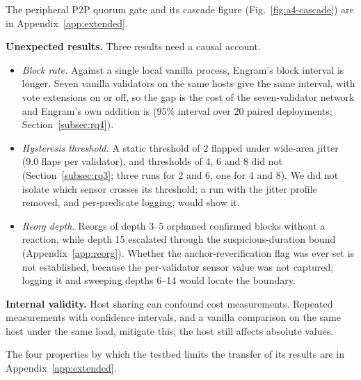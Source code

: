 The peripheral P2P quorum gate and its cascade figure (Fig.~\ref{fig:a4-cascade}) are in Appendix~\ref{app:extended}.

\textbf{Unexpected results.} Three results need a causal account.
\begin{itemize}
  \item \emph{Block rate.} Against a single local vanilla process, Engram's
  block interval is longer. Seven vanilla validators on the same hosts give the same interval,
  with vote extensions on or off, so the gap is the cost of the
  seven-validator network and Engram's own addition is \resOverheadPct{} (95\% interval
  \resOverheadCI{} over 20 paired deployments; Section~\ref{subsec:rq4}).
  \item \emph{Hysteresis threshold.} A static threshold of 2 flapped under
  wide-area jitter (9.0 flaps per validator), and thresholds of 4, 6 and 8 did
  not (Section~\ref{subsec:rq3}; three runs for 2 and 6, one for 4 and 8). We
  did not isolate which sensor crosses its threshold; a run with the jitter
  profile removed, and per-predicate logging, would show it.
  \item \emph{Reorg depth.} Reorgs of depth 3--5 orphaned confirmed blocks
  without a reaction, while depth 15 escalated through the
  suspicious-duration bound (Appendix~\ref{app:reorg}). Whether the
  anchor-reverification flag was ever set is not established, because the
  per-validator sensor value was not captured; logging it and sweeping depths
  6--14 would locate the boundary.
\end{itemize}

\textbf{Internal validity.} Host sharing can confound cost measurements.
Repeated measurements with confidence intervals, and a vanilla comparison on
the same host under the same load, mitigate this; the host still affects
absolute values.

The four properties by which the testbed limits the transfer of its results are in Appendix~\ref{app:extended}.

